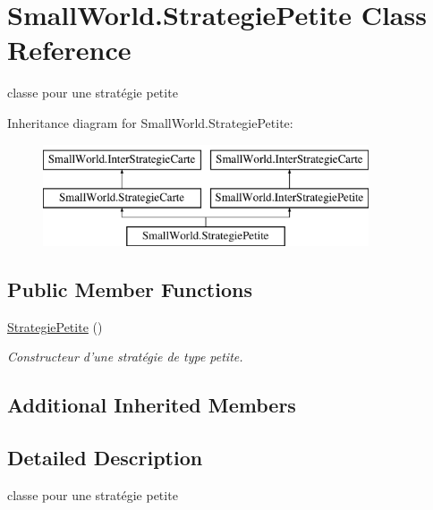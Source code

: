 \hypertarget{class_small_world_1_1_strategie_petite}{\section{Small\-World.\-Strategie\-Petite Class Reference}
\label{class_small_world_1_1_strategie_petite}
}


classe pour une stratégie petite  


Inheritance diagram for Small\-World.\-Strategie\-Petite\-:\begin{figure}[H]
\begin{center}
\leavevmode
\includegraphics[height=3.000000cm]{class_small_world_1_1_strategie_petite}
\end{center}
\end{figure}
\subsection*{Public Member Functions}
\begin{DoxyCompactItemize}
\item 
\hyperlink{class_small_world_1_1_strategie_petite_a1062685f701f9d4d91f22a9c7d89b432}{Strategie\-Petite} ()
\begin{DoxyCompactList}\small\item\em Constructeur d'une stratégie de type petite. \end{DoxyCompactList}\end{DoxyCompactItemize}
\subsection*{Additional Inherited Members}


\subsection{Detailed Description}
classe pour une stratégie petite 

